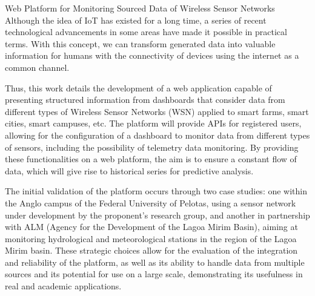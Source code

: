 \documentclass[tcc,capa]{texufpel}
\begin{document}
\begin{englishabstract}{Web Platform for Monitoring Sourced Data of Wireless Sensor Networks}
Although the idea of IoT has existed for a long time, a series of recent technological advancements in some areas have made it possible in practical terms. With this concept, we can transform generated data into valuable information for humans with the connectivity of devices using the internet as a common channel.

Thus, this work details the development of a web application capable of presenting structured information from dashboards that consider data from different types of Wireless Sensor Networks (WSN) applied to smart farms, smart cities, smart campuses, etc. The platform will provide APIs for registered users, allowing for the configuration of a dashboard to monitor data from different types of sensors, including the possibility of telemetry data monitoring. By providing these functionalities on a web platform, the aim is to ensure a constant flow of data, which will give rise to historical series for predictive analysis.

The initial validation of the platform occurs through two case studies: one within the Anglo campus of the Federal University of Pelotas, using a sensor network under development by the proponent's research group, and another in partnership with ALM (Agency for the Development of the Lagoa Mirim Basin), aiming at monitoring hydrological and meteorological stations in the region of the Lagoa Mirim basin. These strategic choices allow for the evaluation of the integration and reliability of the platform, as well as its ability to handle data from multiple sources and its potential for use on a large scale, demonstrating its usefulness in real and academic applications.
\end{englishabstract}

\listoffigures

\listoftables
\end{document}
